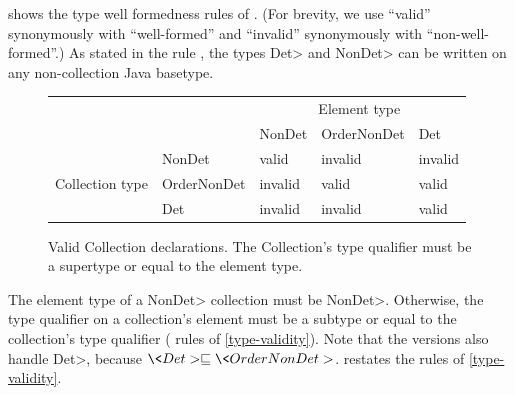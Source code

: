  shows the type well formedness
rules of \ourTypeSystem. 
(For brevity, we use ``valid'' synonymously with ``well-formed'' and
``invalid'' synonymously with ``non-well-formed''.)
As stated in the rule , the types \<Det> and \<NonDet>
can be written on any non-collection Java basetype. 

\begin{figure}
    \centering
    \begin{tabular}{|l|l|l|l|l|}
        \cline{3-5}
        \multicolumn{2}{c|}{~}  &  \multicolumn{3}{c|}{Element type} \\ \cline{3-5}
        \multicolumn{2}{c|}{~}  & NonDet     & OrderNonDet & Det \\ \hline
                        & NonDet      &  valid     &  invalid    & invalid  \\ \cline{2-5}
        Collection type & OrderNonDet &  invalid   &  valid      & valid    \\ \cline{2-5}
                        & Det         &  invalid   &  invalid    & valid    \\ \hline
    \end{tabular}
    \caption{Valid Collection declarations.  The Collection's type qualifier
        must be a supertype or equal to the element type.}
    \label{fig:determinism-collections}
\end{figure}

The element type of a \<NonDet> collection must be \<NonDet>.
Otherwise, the type qualifier on a collection's element must be a subtype or equal to
the collection's type qualifier ( rules of
\cref{type-validity}). Note that the  versions also handle \<Det>,
because $\<Det> \sqsubseteq \<OrderNonDet>$.
 restates the  rules
of
\cref{type-validity}.

